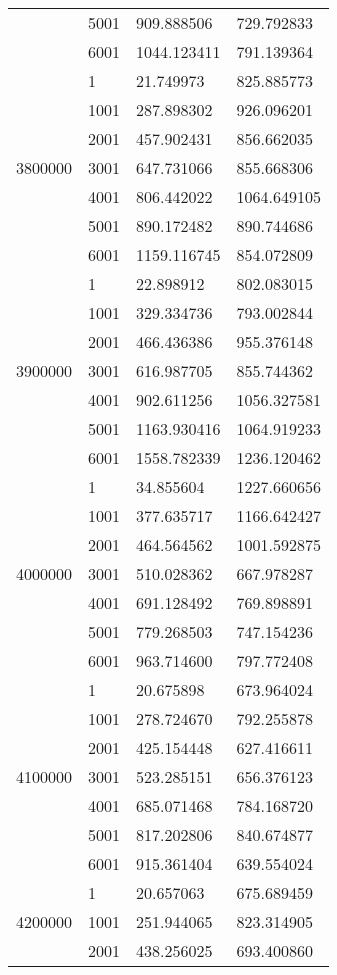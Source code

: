 \begin{table}[htb!]
\begin{tabular}{llll}
 & 5001 & 909.888506 & 729.792833 \\
 & 6001 & 1044.123411 & 791.139364 \\
\multirow[c]{7}{*}{3800000} & 1 & 21.749973 & 825.885773 \\
 & 1001 & 287.898302 & 926.096201 \\
 & 2001 & 457.902431 & 856.662035 \\
 & 3001 & 647.731066 & 855.668306 \\
 & 4001 & 806.442022 & 1064.649105 \\
 & 5001 & 890.172482 & 890.744686 \\
 & 6001 & 1159.116745 & 854.072809 \\
\multirow[c]{7}{*}{3900000} & 1 & 22.898912 & 802.083015 \\
 & 1001 & 329.334736 & 793.002844 \\
 & 2001 & 466.436386 & 955.376148 \\
 & 3001 & 616.987705 & 855.744362 \\
 & 4001 & 902.611256 & 1056.327581 \\
 & 5001 & 1163.930416 & 1064.919233 \\
 & 6001 & 1558.782339 & 1236.120462 \\
\multirow[c]{7}{*}{4000000} & 1 & 34.855604 & 1227.660656 \\
 & 1001 & 377.635717 & 1166.642427 \\
 & 2001 & 464.564562 & 1001.592875 \\
 & 3001 & 510.028362 & 667.978287 \\
 & 4001 & 691.128492 & 769.898891 \\
 & 5001 & 779.268503 & 747.154236 \\
 & 6001 & 963.714600 & 797.772408 \\
\multirow[c]{7}{*}{4100000} & 1 & 20.675898 & 673.964024 \\
 & 1001 & 278.724670 & 792.255878 \\
 & 2001 & 425.154448 & 627.416611 \\
 & 3001 & 523.285151 & 656.376123 \\
 & 4001 & 685.071468 & 784.168720 \\
 & 5001 & 817.202806 & 840.674877 \\
 & 6001 & 915.361404 & 639.554024 \\
\multirow[c]{7}{*}{4200000} & 1 & 20.657063 & 675.689459 \\
 & 1001 & 251.944065 & 823.314905 \\
 & 2001 & 438.256025 & 693.400860 \\

\end{tabular}
\end{table}

